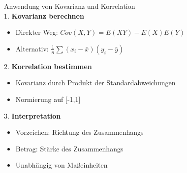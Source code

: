 \begin{KR}{Anwendung von Kovarianz und Korrelation}\\
1. \textbf{Kovarianz berechnen}
   \begin{itemize}
   \item Direkter Weg: $Cov(X,Y) = E(XY) - E(X)E(Y)$
   \item Alternativ: $\frac{1}{n}\sum(x_i-\bar{x})(y_i-\bar{y})$
   \end{itemize}

2. \textbf{Korrelation bestimmen}
   \begin{itemize}
   \item Kovarianz durch Produkt der Standardabweichungen
   \item Normierung auf [-1,1]
   \end{itemize}

3. \textbf{Interpretation}
   \begin{itemize}
   \item Vorzeichen: Richtung des Zusammenhangs
   \item Betrag: Stärke des Zusammenhangs
   \item Unabhängig von Maßeinheiten
   \end{itemize}
\end{KR}



